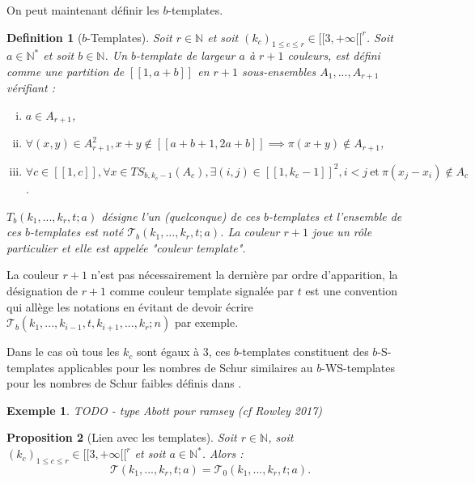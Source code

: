 \documentclass{article}
\newtheorem{definition}{Definition}[section]
\newtheorem{proposition}[definition]{Proposition}
\newtheorem{example}{Exemple}[section]
\newcommand{\TS}{\mathit{TS}}
\begin{document}
On peut maintenant définir les \(b\)-templates.

\begin{definition}[\(b\)-Templates]
Soit \(r \in \mathbb{N}\) et soit \((k_c)_{1 \leqslant c \leqslant r} \in {[\![3, +\infty[\![}^r\). Soit \(a \in \mathbb{N}^*\) et soit \(b \in \mathbb{N}\).  Un \(b\)-template de largeur \(a\) à \(r + 1\) couleurs, est défini comme une partition de \([\![1, a + b]\!]\) en \(r+1\) sous-ensembles \(A_1, ..., A_{r+1}\) vérifiant :
\begin{enumerate}[(i)]
\item \(a \in A_{r+1}\),
\item \(\forall (x, y) \in A_{r + 1}^2, x + y \notin [\![a + b + 1, 2 a + b]\!] \implies \pi(x + y) \notin A_{r + 1}\),
\item \(\forall c \in [\![1, c]\!], \forall x \in \TS_{b, k_c - 1}(A_c), \exists (i, j) \in {[\![1, k_c - 1]\!]}^2, i < j ~\text{et}~ \pi(x_j - x_i) \notin A_c\).
\end{enumerate}
 \(T_b(k_1, ..., k_r, t; a)\) désigne l'un (quelconque) de ces \(b\)-templates et l'ensemble de ces \(b\)-templates est noté \(\mathcal{T}_b(k_1, ..., k_r, t; a)\).  La couleur \(r + 1\) joue un rôle particulier et elle est appelée "couleur template".
\end{definition}

La couleur \(r + 1\)  n'est pas nécessairement la dernière par ordre d'apparition, la désignation de \(r+1\) comme couleur template signalée par \(t\) est une convention qui allège les notations en évitant de devoir écrire \(\mathcal{T}_b(k_1, ..., k_{i - 1}, t,  k_{i + 1}, ..., k_r; n)\) par exemple.

Dans le cas où tous les \(k_c\) sont égaux à 3, ces \(b\)-templates constituent des \(b\)-S-templates applicables pour les nombres de Schur similaires au \(b\)-WS-templates pour les nombres de Schur faibles définis dans \cite{schurboyz}.

\begin{example}
TODO - type Abott pour ramsey (cf  Rowley 2017)
\end{example}

\begin{proposition}[Lien avec les templates]
Soit \(r \in \mathbb{N}\), soit \((k_c)_{1 \leqslant c \leqslant r} \in {[\![3, +\infty[\![}^r\) et soit \(a \in \mathbb{N}^*\). Alors :
\[ \mathcal{T}(k_1, ..., k_r, t; a) = \mathcal{T}_0(k_1, ..., k_r, t; a). \]
\end{proposition}
\end{document}
